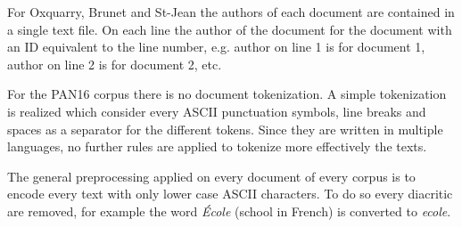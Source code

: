 For Oxquarry, Brunet and St-Jean the authors of each document are contained in a single text file.
On each line the author of the document for the document with an ID equivalent to the line number, e.g. author on line 1 is for document 1, author on line 2 is for document 2, etc.

For the PAN16 corpus there is no document tokenization.
A simple tokenization is realized which consider every ASCII punctuation symbols, line breaks and spaces as a separator for the different tokens.
Since they are written in multiple languages, no further rules are applied to tokenize more effectively the texts.

The general preprocessing applied on every document of every corpus is to encode every text with only lower case ASCII characters.
To do so every diacritic are removed, for example the word \textit{École} (school in French) is converted to \textit{ecole}.
